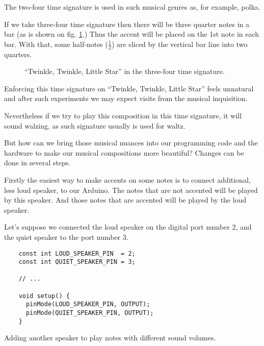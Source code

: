 \documentclass[../sparc.tex]{subfiles}
\begin{document}
The two-four time signature is used in such musical genres as, for example,
polka.

If we take three-four time signature then there will be three quarter notes in a
bar (as is shown on fig. \ref{fig:lilypond-musical-scale-example-4}.)  Thus the
accent will be placed on the 1st note in each bar.  With that, some half-notes
($\frac{1}{2}$) are sliced by the vertical bar line into two quarters.

\begin{figure}[h]
  \centering
  \caption{``Twinkle, Twinkle, Little Star'' in the three-four time signature.}
  \label{fig:lilypond-musical-scale-example-4}
\end{figure}

Enforcing this time signature on ``Twinkle, Twinkle, Little Star'' feels
unnatural and after such experiments we may expect visits from the musical
inquisition.

Nevertheless if we try to play this composition in this time signature, it will
sound walzing, as such signature usually is used for waltz.

But how can we bring those musical nuances into our programming code and the
hardware to make our musical compositions more beautiful?  Changes can be done
in several steps.

Firstly the easiest way to make accents on some notes is to connect additional,
less loud speaker, to our Arduino.  The notes that are not accented will be
played by this speaker.  And those notes that are accented will be played by the
loud speaker.

Let's suppose we connected the loud speaker on the digital port number 2, and
the quiet speaker to the port number 3.

\begin{listing}[ht]
  \begin{verbatim}
    const int LOUD_SPEAKER_PIN  = 2;
    const int QUIET_SPEAKER_PIN = 3;

    // ...

    void setup() {
      pinMode(LOUD_SPEAKER_PIN, OUTPUT);
      pinMode(QUIET_SPEAKER_PIN, OUTPUT);
    }
  \end{verbatim}
  \label{listing:adding-additional-speaker}
  \caption{Adding another speaker to play notes with different sound volumes.}
\end{listing}
\end{document}
